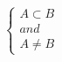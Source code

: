 \documentclass[preview]{standalone}
\begin{document}
\begin{align*}
\begin{cases}
                         A \subset B\\
                         and\\
                         A \neq B
                         \end{cases}
\end{align*}
\end{document}
